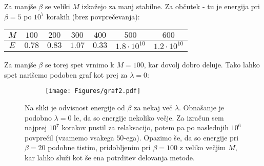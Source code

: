 \documentclass{article}
\begin{document}
Za manjše $\beta$ se veliki $M$ izkažejo za manj stabilne. Za občutek - tu je energija pri $\beta=5$ po $10^7$ korakih (brez povprečevanja):
\begin{center}
\begin{tabular}{|c|c|c|c|c|c|c|}
\hline
$M$ & $100$  & $200$  & $300$  & $400$  & $500$       & $600$              \\ \hline
$E$ & $0.78$ & $0.83$ & $1.07$ & $0.33$ & $1.8 \cdot 10^{10}$ & $1.2 \cdot 10^{10}$ \\ \hline
\end{tabular}
\end{center}
Za manjše $\beta$ se torej spet vrnimo k $M=100$, kar dovolj dobro deluje. Tako lahko spet narišemo podoben graf kot prej za $\lambda=0$:

\begin{figure}[H]
\centering
\begin{subfigure}{\textwidth}
\texttt{[image: Figures/graf2.pdf]}
\end{subfigure}
\caption*{Na sliki je odvisnost energije od $\beta$ za nekaj več $\lambda$. Obnašanje je podobno $\lambda=0$ le, da so energije nekoliko večje. Za izračun sem najprej $10^7$ korakov pustil za relaksacijo, potem pa po naslednjih $10^6$ povprečil (vzamemo  vsakega $50$-ega). Opazimo še, da so energije pri $\beta=20$ podobne tistim, pridobljenim pri $\beta=100$ z veliko večjim $M$, kar lahko služi kot še ena potrditev delovanja metode. }
\end{figure}
\end{document}
